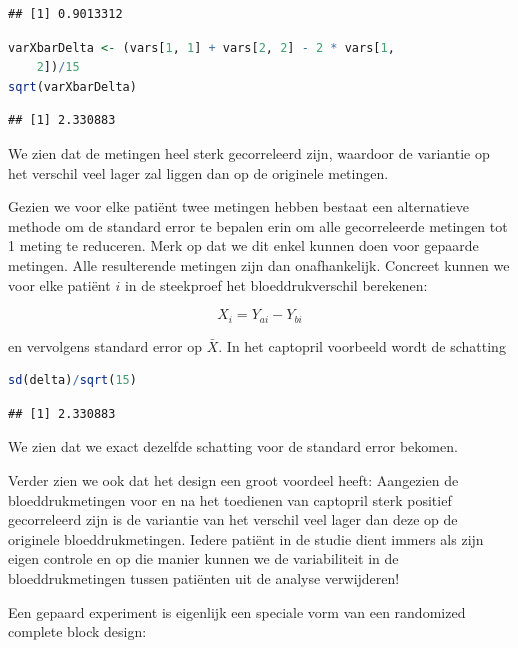\documentclass[
  12pt,dutch,coursenotes]{book}
\theoremstyle{definition}
\theoremstyle{definition}
\theoremstyle{definition}
\theoremstyle{definition}
\theoremstyle{remark}
\begin{document}
\begin{lstlisting}
## [1] 0.9013312
\end{lstlisting}

\begin{lstlisting}[language=R]
varXbarDelta <- (vars[1, 1] + vars[2, 2] - 2 * vars[1,
    2])/15
sqrt(varXbarDelta)
\end{lstlisting}

\begin{lstlisting}
## [1] 2.330883
\end{lstlisting}

We zien dat de metingen heel sterk gecorreleerd zijn, waardoor de variantie op het verschil veel lager zal liggen dan op de originele metingen.

Gezien we voor elke patiënt twee metingen hebben bestaat een alternatieve methode om de standard error te bepalen erin om alle gecorreleerde metingen tot 1 meting te reduceren. Merk op dat we dit enkel kunnen doen voor gepaarde metingen. Alle resulterende metingen zijn dan onafhankelijk.
Concreet kunnen we voor elke patiënt \(i\) in de steekproef het bloeddrukverschil berekenen:

\[X_{i}=Y_{ai}-Y_{bi}\]

en vervolgens standard error op \(\bar X\).
In het captopril voorbeeld wordt de schatting

\begin{lstlisting}[language=R]
sd(delta)/sqrt(15)
\end{lstlisting}

\begin{lstlisting}
## [1] 2.330883
\end{lstlisting}

We zien dat we exact dezelfde schatting voor de standard error bekomen.

Verder zien we ook dat het design een groot voordeel heeft:
Aangezien de bloeddrukmetingen voor en na het toedienen van captopril sterk positief gecorreleerd zijn is de variantie van het verschil veel lager dan deze op de originele bloeddrukmetingen.
Iedere patiënt in de studie dient immers als zijn eigen controle en op die manier kunnen we de variabiliteit in de bloeddrukmetingen tussen patiënten uit de analyse verwijderen!

Een gepaard experiment is eigenlijk een speciale vorm van een randomized complete block design:
\end{document}
